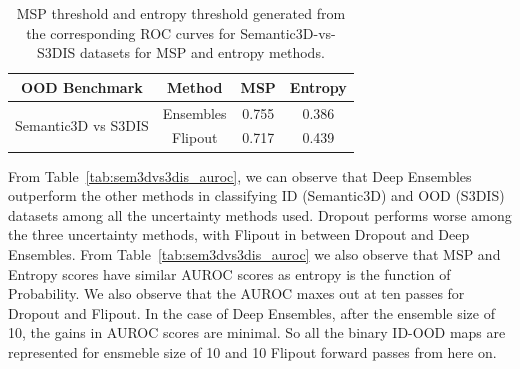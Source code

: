     \begin{table}[h!]
        \centering
        \begin{tabular}{cccc}
            \hline
            OOD Benchmark                                           & Method    & MSP   & Entropy \\ \hline
            \multirow{2}{*}{Semantic3D vs S3DIS}                    & Ensembles & 0.755 & 0.386   \\
                                                                    & Flipout   & 0.717 & 0.439   \\ \hline
        \end{tabular}
        \caption{MSP threshold and entropy threshold generated from the corresponding ROC curves for Semantic3D-vs-S3DIS datasets for MSP and entropy methods.}
        \label{tab:thresholds}
    \end{table}
    From Table~\ref{tab:sem3dvs3dis_auroc}, we can observe that Deep Ensembles outperform the other methods in classifying ID (Semantic3D) and OOD (S3DIS) datasets among all the uncertainty methods used.
    Dropout performs worse among the three uncertainty methods, with Flipout in between Dropout and Deep Ensembles.
    From Table~\ref{tab:sem3dvs3dis_auroc} we also observe that MSP and Entropy scores have similar AUROC scores as entropy is the function of Probability.
    We also observe that the AUROC maxes out at ten passes for Dropout and Flipout.
    In the case of Deep Ensembles, after the ensemble size of 10, the gains in AUROC scores are minimal.
    So all the binary ID-OOD maps are represented for ensmeble size of 10 and 10 Flipout forward passes  from here on.

